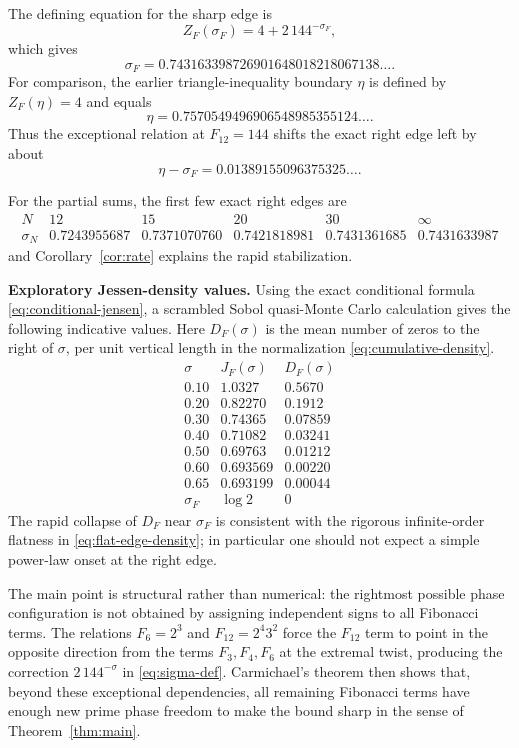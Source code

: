 \documentclass[11pt]{article}
\theoremstyle{remark}
\newcommand{\ZF}{Z_F}
\newcommand{\JF}{J_F}
\begin{document}
The defining equation for the sharp edge is
\[
\ZF(\sigma_F)=4+2\,144^{-\sigma_F},
\]
which gives
\[
\boxed{\sigma_F=0.743163398726901648018218067138\ldots}.
\]
For comparison, the earlier triangle-inequality boundary $\eta$ is defined by $\ZF(\eta)=4$ and equals
\[
\eta=0.7570549496906548985355124\ldots.
\]
Thus the exceptional relation at $F_{12}=144$ shifts the exact right edge left by about
\[
\eta-\sigma_F=0.01389155096375325\ldots.
\]

For the partial sums, the first few exact right edges are
\[
\begin{array}{c|ccccc}
N&12&15&20&30&\infty\\
\hline
\sigma_N&0.7243955687&0.7371070760&0.7421818981&0.7431361685&0.7431633987
\end{array}
\]
and Corollary~\ref{cor:rate} explains the rapid stabilization.


\medskip
\noindent\textbf{Exploratory Jessen-density values.}
Using the exact conditional formula \eqref{eq:conditional-jensen}, a scrambled Sobol quasi-Monte Carlo calculation gives the following indicative values.  Here $D_F(\sigma)$ is the mean number of zeros to the right of $\sigma$, per unit vertical length in the normalization \eqref{eq:cumulative-density}.
\[
\begin{array}{c|cc}
\sigma&\JF(\sigma)&D_F(\sigma)\\
\hline
0.10&1.0327&0.5670\\
0.20&0.82270&0.1912\\
0.30&0.74365&0.07859\\
0.40&0.71082&0.03241\\
0.50&0.69763&0.01212\\
0.60&0.693569&0.00220\\
0.65&0.693199&0.00044\\
\sigma_F&\log2&0
\end{array}
\]
The rapid collapse of $D_F$ near $\sigma_F$ is consistent with the rigorous infinite-order flatness in \eqref{eq:flat-edge-density}; in particular one should not expect a simple power-law onset at the right edge.

The main point is structural rather than numerical: the rightmost possible phase configuration is not obtained by assigning independent signs to all Fibonacci terms.  The relations $F_6=2^3$ and $F_{12}=2^4 3^2$ force the $F_{12}$ term to point in the opposite direction from the terms $F_3,F_4,F_6$ at the extremal twist, producing the correction $2\,144^{-\sigma}$ in \eqref{eq:sigma-def}.  Carmichael's theorem then shows that, beyond these exceptional dependencies, all remaining Fibonacci terms have enough new prime phase freedom to make the bound sharp in the sense of Theorem~\ref{thm:main}.
\end{document}
